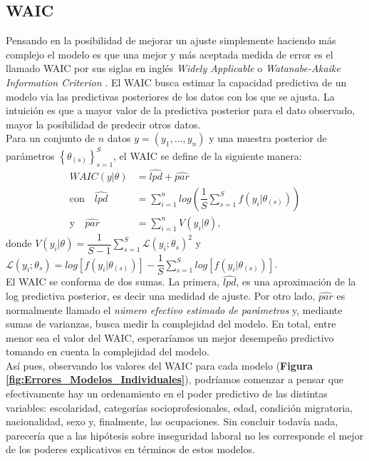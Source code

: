\subsection{WAIC}

Pensando en la posibilidad de mejorar un ajuste simplemente haciendo más complejo el modelo es que una mejor y más aceptada medida de error es el llamado WAIC por sus siglas en inglés \textit{Widely Applicable} o \textit{Watanabe-Akaike Information Criterion} \parencite{Vehtari16}. El WAIC busca estimar la capacidad predictiva de un modelo via las predictivas posteriores de los datos con los que se ajusta. La intuición es que a mayor valor de la predictiva posterior para el dato observado, mayor la posibilidad de predecir otros datos.\\ 

Para un conjunto de $n$ datos $y=(y_1,\dots,y_n)$ y una muestra posterior de parámetros $\left\lbrace\theta_{(s)}\right\rbrace_{s=1}^S$, el WAIC se define de la siguiente manera:
\begin{align}\label{WAIC}
WAIC(y|\theta) &= \widehat{lpd} + \widehat{par} \\
\text{con} \quad \widehat{lpd} &= \sum_{i=1}^{n} log\left(\dfrac{1}{S}\sum\limits_{s=1}^S f(y_i|\theta_{(s)}) \right) \nonumber \\
\text{y} \quad \widehat{par} &= \sum\limits_{i=1}^n V(y_i|\theta), \nonumber
\end{align}
donde $V(y_i|\theta)=\dfrac{1}{S-1}\sum\limits_{s=1}^S \mathcal{L}(y_i;\theta_{s})^2$ y $\mathcal{L}(y_i;\theta_{s}) = log\left[f(y_i|\theta_{(s)})\right] - \dfrac{1}{S}\sum\limits_{s=1}^S log\left[f(y_i|\theta_{(s)})\right]$.{}\\

El WAIC se conforma de dos sumas. La primera, $\widehat{lpd}$, es una aproximación de la log predictiva posterior, es decir una medidad de ajuste. Por otro lado, $\widehat{par}$ es normalmente llamado el \textit{número efectivo estimado de parámetros} y, mediante sumas de varianzas, busca medir la complejidad del modelo. En total, entre menor sea el valor del WAIC, esperaríamos un mejor desempeño predictivo tomando en cuenta la complejidad del modelo.\\

Así pues, observando los valores del WAIC para cada modelo (\textbf{Figura \ref{fig:Errores_Modelos_Individuales}}), podríamos comenzar a pensar que efectivamente hay un ordenamiento en el poder predictivo de las distintas variables: escolaridad, categorías socioprofesionales, edad, condición migratoria, nacionalidad, sexo y, finalmente, las ocupaciones. Sin concluir todavía nada, parecería que a las hipótesis sobre inseguridad laboral no les corresponde el mejor de los poderes explicativos en términos de estos modelos.

